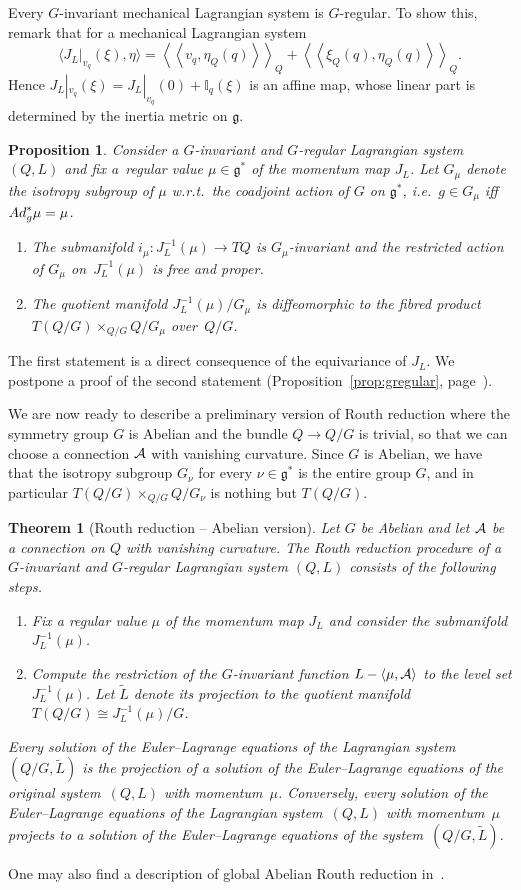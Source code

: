 \documentclass[11pt]{article}
\newtheorem{theorem}{Theorem}
\newtheorem{proposition}{Proposition}
\renewcommand{\ll}{\left<\!\left<}
\renewcommand{\gg}{\right>\!\right>}
\newcommand{\A}{{\cal A}}
\newcommand{\lag}{\mathfrak{g}}
\begin{document}
Every $G$-invariant mechanical Lagrangian system is $G$-regular. To show this, remark that for a mechanical Lagrangian system \[\langle J_L|_{v_q}(\xi)  , \eta \rangle =\ll v_q,\eta_Q(q)\gg_Q+ \ll \xi_Q(q), \eta_Q(q)\gg_Q.\] Hence $J_L|_{v_q}(\xi) = J_L|_{v_q}(0) + \mathbb{I}_q(\xi)$ is an af\/f\/ine map, whose linear part is determined by the inertia metric on $\lag$.
\begin{proposition}
Consider a $G$-invariant and $G$-regular Lagrangian system $(Q,L)$ and fix a~re\-gu\-lar value $\mu\in\lag^*$ of the momentum map $J_L$. Let $G_\mu$ denote the isotropy subgroup of $\mu$ w.r.t.\ the coadjoint action of $G$ on $\lag^*$, i.e.\ $g\in G_\mu$ iff ${\rm Ad}^*_g\mu = \mu$.
\begin{enumerate}\itemsep=0pt
\item[$1.$] The submanifold $i_\mu:J^{-1}_L(\mu)\to TQ$ is $G_\mu$-invariant and the restricted action of $G_\mu$ on~$J^{-1}_L(\mu)$ is free and proper.
\item[$2.$] The quotient manifold $J^{-1}_L(\mu)/G_\mu$ is diffeomorphic to the fibred product $T(Q/G) \times_{Q/G} Q/G_\mu$ over~$Q/G$.
\end{enumerate}
\end{proposition}
The f\/irst statement is a direct consequence of the equivariance of $J_L$. We postpone a proof of the second statement (Proposition~\ref{prop:gregular}, page~\pageref{prop:gregular}).

We are now ready to describe a preliminary version of Routh reduction where the symmetry group $G$ is Abelian and the bundle $Q\to Q/G$ is trivial, so that we can choose a connection $\A$ with vanishing curvature.  Since $G$ is Abelian, we have that the isotropy subgroup $G_\nu$ for every $\nu \in \lag^*$ is the entire group $G$, and in particular $T(Q/G)\times_{Q/G} Q/G_\nu$ is nothing but $T(Q/G)$.
\begin{theorem}[Routh reduction -- Abelian version] Let $G$ be Abelian and let $\A$ be a connection on $Q$ with vanishing curvature. The Routh reduction procedure of a $G$-invariant and $G$-regular Lagrangian system $(Q,L)$ consists of the following steps.
\begin{enumerate}\itemsep=0pt
\item[$1.$] Fix a regular value $\mu$ of the momentum map $J_L$ and consider the submanifold $
J^{-1}_L(\mu)$.
\item[$2.$] Compute the restriction of the $G$-invariant function $L-\langle \mu , \A \rangle$ to the level set $J^{-1}_L(\mu)$. Let $\tilde L$ denote its projection to the quotient manifold $T(Q/G)\cong J^{-1}_L(\mu)/G$.
\end{enumerate}
Every solution of the Euler--Lagrange equations of the Lagrangian system $(Q/G,\tilde L)$ is the projection of a solution of the Euler--Lagrange equations of the original system~$(Q,L)$ with momentum~$\mu$. Conversely, every solution of the Euler--Lagrange equations of the Lagrangian system~$(Q,L)$ with momentum~$\mu$ projects to a solution of the Euler--Lagrange equations of the system~$(Q/G,\tilde L)$.
\end{theorem}
One may also f\/ind a description of global Abelian Routh reduction in~\cite{arnold}.
\end{document}
